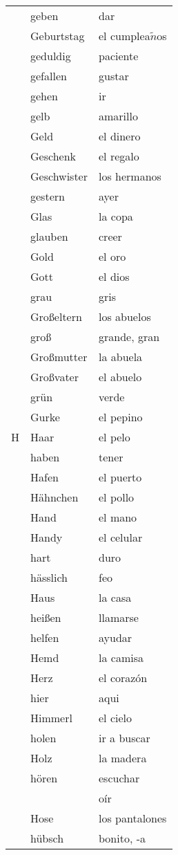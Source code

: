 \documentclass{spanish_summary}
\begin{document}
\begin{longtable}{p{} p{} | p{}}
& geben & dar  \\
& Geburtstag & el cumplea$\tilde{n}$os  \\
& geduldig & paciente \\
& gefallen & gustar  \\
& gehen & ir  \\
& gelb & amarillo  \\
& Geld & el dinero  \\
& Geschenk & el regalo \\
& Geschwister & los hermanos  \\
& gestern & ayer  \\
& Glas & la copa  \\
& glauben & creer \\
& Gold & el oro \\
& Gott & el dios \\
& grau & gris  \\
& Großeltern & los abuelos  \\
& groß & grande, gran  \\
& Großmutter & la abuela  \\
& Großvater & el abuelo  \\
& grün & verde  \\
& Gurke & el pepino \\
H & Haar & el pelo  \\
& haben & tener  \\
& Hafen & el puerto  \\
& Hähnchen & el pollo  \\
& Hand & el mano  \\
& Handy & el celular  \\
& hart & duro  \\
& hässlich & feo \\
& Haus & la casa  \\
& heißen & llamarse \\
& helfen & ayudar  \\
& Hemd & la camisa  \\
& Herz & el corazón \\
& hier & aqui  \\
& Himmerl & el cielo  \\
& holen & ir a buscar  \\
& Holz & la madera  \\
& hören & escuchar \\
& & oír \\
& Hose & los pantalones  \\
& hübsch & bonito, -a \\

\end{longtable}
\end{document}
